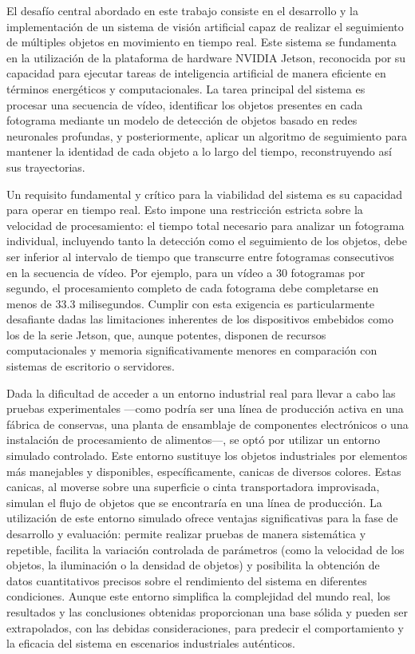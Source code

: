 \documentclass[11pt,spanish,listoffigures,listoftables]{tfgetsinf}
\begin{document}
El desafío central abordado en este trabajo consiste en el desarrollo y la implementación de un sistema de visión artificial capaz de realizar el seguimiento de múltiples objetos en movimiento en tiempo real. Este sistema se fundamenta en la utilización de la plataforma de hardware NVIDIA Jetson, reconocida por su capacidad para ejecutar tareas de inteligencia artificial de manera eficiente en términos energéticos y computacionales. La tarea principal del sistema es procesar una secuencia de vídeo, identificar los objetos presentes en cada fotograma mediante un modelo de detección de objetos basado en redes neuronales profundas, y posteriormente, aplicar un algoritmo de seguimiento para mantener la identidad de cada objeto a lo largo del tiempo, reconstruyendo así sus trayectorias.

Un requisito fundamental y crítico para la viabilidad del sistema es su capacidad para operar en tiempo real. Esto impone una restricción estricta sobre la velocidad de procesamiento: el tiempo total necesario para analizar un fotograma individual, incluyendo tanto la detección como el seguimiento de los objetos, debe ser inferior al intervalo de tiempo que transcurre entre fotogramas consecutivos en la secuencia de vídeo. Por ejemplo, para un vídeo a 30 fotogramas por segundo, el procesamiento completo de cada fotograma debe completarse en menos de 33.3 milisegundos. Cumplir con esta exigencia es particularmente desafiante dadas las limitaciones inherentes de los dispositivos embebidos como los de la serie Jetson, que, aunque potentes, disponen de recursos computacionales y memoria significativamente menores en comparación con sistemas de escritorio o servidores.

Dada la dificultad de acceder a un entorno industrial real para llevar a cabo las pruebas experimentales —como podría ser una línea de producción activa en una fábrica de conservas, una planta de ensamblaje de componentes electrónicos o una instalación de procesamiento de alimentos—, se optó por utilizar un entorno simulado controlado. Este entorno sustituye los objetos industriales por elementos más manejables y disponibles, específicamente, canicas de diversos colores. Estas canicas, al moverse sobre una superficie o cinta transportadora improvisada, simulan el flujo de objetos que se encontraría en una línea de producción. La utilización de este entorno simulado ofrece ventajas significativas para la fase de desarrollo y evaluación: permite realizar pruebas de manera sistemática y repetible, facilita la variación controlada de parámetros (como la velocidad de los objetos, la iluminación o la densidad de objetos) y posibilita la obtención de datos cuantitativos precisos sobre el rendimiento del sistema en diferentes condiciones. Aunque este entorno simplifica la complejidad del mundo real, los resultados y las conclusiones obtenidas proporcionan una base sólida y pueden ser extrapolados, con las debidas consideraciones, para predecir el comportamiento y la eficacia del sistema en escenarios industriales auténticos.
\end{document}

